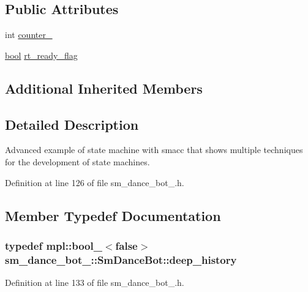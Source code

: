 \subsection*{Public Attributes}
\begin{DoxyCompactItemize}
\item 
int \hyperlink{structsm__dance__bot__3_1_1SmDanceBot_ad91a1bf0a46ee80bebe007a75cbe429d}{counter\+\_}
\item 
\hyperlink{classbool}{bool} \hyperlink{structsm__dance__bot__3_1_1SmDanceBot_a3f8e3b6a1b7cb4984e9fe281d84a2ab2}{rt\+\_\+ready\+\_\+flag}
\end{DoxyCompactItemize}
\subsection*{Additional Inherited Members}


\subsection{Detailed Description}
Advanced example of state machine with smacc that shows multiple techniques for the development of state machines. 

Definition at line 126 of file sm\+\_\+dance\+\_\+bot\+\_.\+h.



\subsection{Member Typedef Documentation}
\subsubsection[{\texorpdfstring{deep\+\_\+history}{deep_history}}]{\setlength{\rightskip}{0pt plus 5cm}typedef mpl\+::bool\+\_\+$<$false$>$ {\bf sm\+\_\+dance\+\_\+bot\+\_\+::\+Sm\+Dance\+Bot\+::deep\+\_\+history}}\hypertarget{structsm__dance__bot__3_1_1SmDanceBot_af4725d37e5f9649b7ca07382435e7287}{}\label{structsm__dance__bot__3_1_1SmDanceBot_af4725d37e5f9649b7ca07382435e7287}


Definition at line 133 of file sm\+\_\+dance\+\_\+bot\+\_.\+h.

